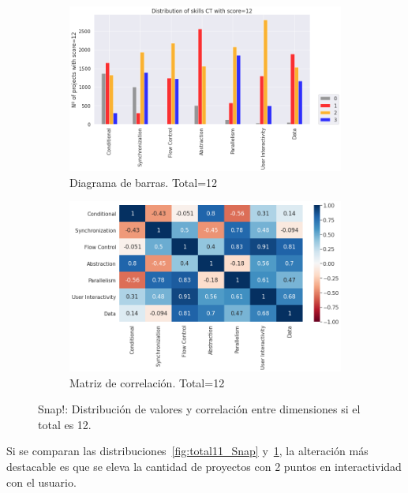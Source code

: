 \documentclass[a4paper, 12pt]{book}
\begin{document}
\begin{figure}[H]
    \centering
    \begin{subfigure}[h]{.49\textwidth} 
        \includegraphics[width=\textwidth]{img/distribucion_12_Snap}
        \caption{Diagrama de barras. Total=12}
        \label{fig:total12_Snap}
    \end{subfigure}       
    \begin{subfigure}[h]{.49\textwidth} 
        \includegraphics[width=\textwidth]{img/corr_12_Snap}
        \caption{Matriz de correlación. Total=12}
        \label{fig:corr12_Snap}
    \end{subfigure}
    \caption{Snap!: Distribución de valores y correlación entre dimensiones si el total es 12.}
\end{figure}

Si se comparan las distribuciones~\ref{fig:total11_Snap} y~\ref{fig:total12_Snap}, la alteración más destacable es que se eleva la cantidad de proyectos con 2 puntos en interactividad con el usuario.
\end{document}
